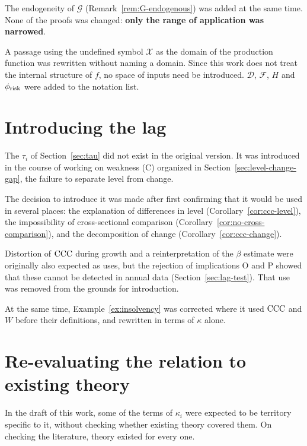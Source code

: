 The endogeneity of $\mathcal{G}$ (Remark~\ref{rem:G-endogenous}) was added at the same time. None
of the proofs was changed: \textbf{only the range of application was narrowed}.

A passage using the undefined symbol $\mathcal{X}$ as the domain of the production function was
rewritten without naming a domain. Since this work does not treat the internal structure of $f$,
no space of inputs need be introduced. $\mathcal{D}$, $\mathcal{F}$, $H$ and $\phi_{\rm risk}$
were added to the notation list.

\section{Introducing the lag}

The $\tau_i$ of Section~\ref{sec:tau} did not exist in the original version. It was introduced in
the course of working on weakness (C) organized in
Section~\ref{sec:level-change-gap}, the failure to separate level from change.

The decision to introduce it was made after first confirming that it would be used in several
places: the explanation of differences in level (Corollary~\ref{cor:ccc-level}), the impossibility
of cross-sectional comparison (Corollary~\ref{cor:no-cross-comparison}), and the decomposition of
change (Corollary~\ref{cor:ccc-change}).

Distortion of $\mathrm{CCC}$ during growth and a reinterpretation of the $\beta$ estimate were originally
also expected as uses, but the rejection of implications O and P showed that these cannot be
detected in annual data (Section~\ref{sec:lag-test}). That use was removed from the grounds for
introduction.

At the same time, Example~\ref{ex:insolvency} was corrected where it used $\mathrm{CCC}$ and $W$ before
their definitions, and rewritten in terms of $\kappa$ alone.

\section{Re-evaluating the relation to existing theory}

In the draft of this work, some of the terms of $\kappa_i$ were expected to be territory specific
to it, without checking whether existing theory covered them. On checking the literature, theory
existed for every one.

